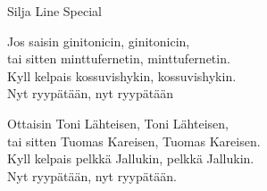 \begin{song}{Silja Line Special}


    Jos saisin ginitonicin, ginitonicin,\\
    tai sitten minttufernetin, minttufernetin.\\
    Kyll kelpais kossuvishykin, kossuvishykin.\\
    Nyt ryypätään, nyt ryypätään

    Ottaisin Toni Lähteisen, Toni Lähteisen,\\
    tai sitten Tuomas Kareisen, Tuomas Kareisen.\\
    Kyll kelpais pelkkä Jallukin, pelkkä Jallukin.\\
    Nyt ryypätään, nyt ryypätään.

\end{song}